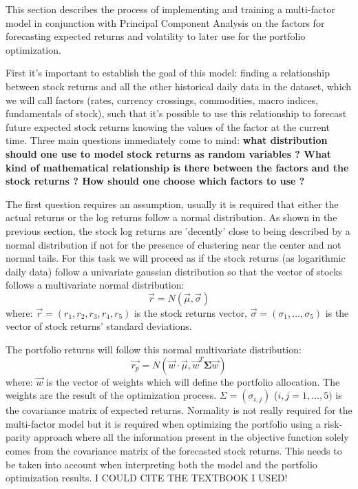 This section describes the process of implementing and training a multi-factor model in conjunction with Principal Component Analysis on the factors for forecasting expected returns and volatility to later use for the portfolio optimization.

First it's important to establish the goal of this model: finding a relationship between stock returns and all the other historical daily data in the dataset, which we will call factors (rates, currency crossings, commodities, macro indices, fundamentals of stock), such that it's possible to use this relationship to forecast future expected stock returns knowing the values of the factor at the current time.
Three main questions immediately come to mind: \textbf{what distribution should one use to model stock returns as random variables ? What kind of mathematical relationship is there between the factors and the stock returns ? How should one choose which factors to use ?} 

The first question requires an assumption, usually it is required that either the actual returns or the log returns follow a normal distribution. As shown in the previous section, the stock log returns are 'decently' close to being described by a normal distribution if not for the presence of clustering near the center and not normal tails. For this task we will proceed as if the stock returns (as logarithmic daily data) follow a univariate gaussian distribution so that the vector of stocks follows a multivariate normal distribution:
\begin{equation}
    \Vec{r} = N(\Vec{\mu}, \Vec{\sigma})
\end{equation}
where: $\Vec{r} = (r_1, r_2, r_3, r_4, r_5)$ is the stock returns vector, $\Vec{\sigma} = (\sigma_1, \dots, \sigma_5)$ is the vector of stock returns' standard deviations.

The  portfolio returns will follow this normal multivariate distribution:
\begin{equation}
        \Vec{r_p} = N(\Vec{w}\cdot\Vec{\mu}, \Vec{w}^{T}\mathbf{\Sigma}\Vec{w})
\end{equation}
where: $\Vec{w}$ is the vector of weights which will define the portfolio allocation. The weights are the result of the optimization process. $\Sigma = (\sigma_{i,j})$ ($i,j = 1,...,5)$ is the covariance matrix of expected returns.
Normality is not really required for the multi-factor model but it is required when optimizing the portfolio using a risk-parity approach where all the information present in the objective function solely comes from the covariance matrix of the forecasted stock returns. This needs to be taken into account when interpreting both the model and the portfolio optimization results.
I COULD CITE THE TEXTBOOK I USED!


